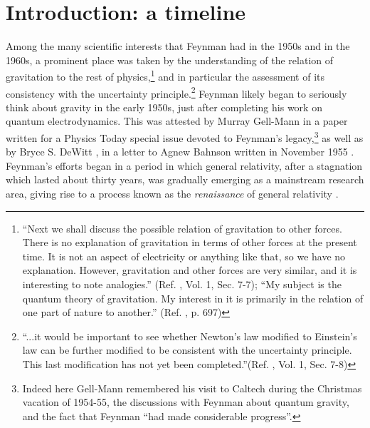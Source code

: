 \documentclass{ws-procs961x669}            %
\begin{document}
\section{Introduction: a timeline}\label{sec1}
Among the many scientific interests that Feynman had in the 1950s
and in the 1960s, a prominent place was taken by the understanding
of the relation of gravitation to the rest of
physics,\footnote{``Next we shall discuss the possible relation of
gravitation to other forces. There is no explanation of
gravitation in terms of other forces at the present time. It is
not an aspect of electricity or anything like that, so we have no
explanation. However, gravitation and other forces are very
similar, and it is interesting to note analogies.'' (Ref.
, Vol. 1, Sec. 7-7); ``My subject is the
quantum theory of gravitation. My interest in it is primarily in
the relation of one part of nature to another.'' (Ref.
, p. 697)} and in particular the
assessment of its consistency with the uncertainty
principle.\footnote{``...it would be important to see whether
Newton's law modified to Einstein's law can be further modified to
be consistent with the uncertainty principle. This last
modification has not yet been completed.''(Ref.
, Vol. 1, Sec. 7-8)} Feynman likely began
to seriously think about gravity in the early 1950s, just after
completing his work on quantum electrodynamics. This was attested
by Murray Gell-Mann \cite{Gell-Mann} in a paper written for a
Physics Today special issue devoted to Feynman's
legacy,\footnote{Indeed here Gell-Mann remembered his visit to
Caltech during the Christmas vacation of 1954-55, the discussions
with Feynman about quantum gravity, and the fact that Feynman
``had made considerable progress''.} as well as by Bryce S. DeWitt
\cite{ChapelHill}, in a letter to Agnew Bahnson written in
November 1955 \cite{Letter}. Feynman's efforts began in a period
in which general relativity, after a stagnation which lasted about
thirty years, was gradually emerging as a mainstream research
area, giving rise to a process known as the \emph{renaissance} of
general relativity \cite{BlumLalliRenn}.
\end{document}
